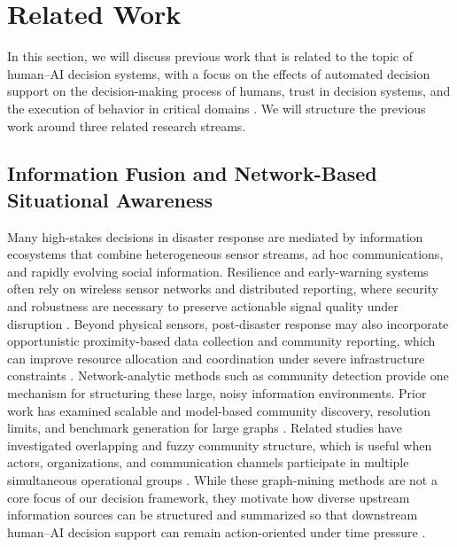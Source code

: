 \documentclass[journal]{IEEEtran}
\theoremstyle{plain}
\theoremstyle{definition}
\begin{document}
\section{Related Work}
In this section, we will discuss previous work that is related to the topic of human--AI decision systems, with a focus on the effects of automated decision support on the decision-making process of humans, trust in decision systems, and the execution of behavior in critical domains \cite{Bach2024Access,PerezCerrolaza2024CSUR,Yang2022THMSReview,Lai2023FAccT}. We will structure the previous work around three related research streams.


\subsection{Information Fusion and Network-Based Situational Awareness}
Many high-stakes decisions in disaster response are mediated by information ecosystems that combine heterogeneous sensor streams, ad hoc communications, and rapidly evolving social information. Resilience and early-warning systems often rely on wireless sensor networks and distributed reporting, where security and robustness are necessary to preserve actionable signal quality under disruption \cite{Yang2005MobiHoc}. Beyond physical sensors, post-disaster response may also incorporate opportunistic proximity-based data collection and community reporting, which can improve resource allocation and coordination under severe infrastructure constraints \cite{Longo2025PMC,Stephens2022SIGDOC}.
Network-analytic methods such as community detection provide one mechanism for structuring these large, noisy information environments. Prior work has examined scalable and model-based community discovery, resolution limits, and benchmark generation for large graphs \cite{Wakita2007WWW,Prokhorenkova2019WWW,Xian2025WWW,Slota2019SC,Sun2014FSKD,Rezaei2015ASONAM,Akhter2022ICCA}. Related studies have investigated overlapping and fuzzy community structure, which is useful when actors, organizations, and communication channels participate in multiple simultaneous operational groups \cite{Sun2011InformationSciences,Havens2013TFUZZ,Vehlow2013TVCG,Zhang2012KDD,Cao2020ICIIP,Li2022AppliedIntelligence}. While these graph-mining methods are not a core focus of our decision framework, they motivate how diverse upstream information sources can be structured and summarized so that downstream human--AI decision support can remain action-oriented under time pressure \cite{Duan2014KDD}.
\end{document}

